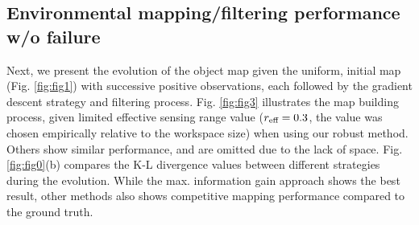 \documentclass[letterpaper, 10 pt, conference]{ieeeconf}
\begin{document}
\subsection{Environmental mapping/filtering performance w/o failure}
Next, we present the evolution of the object map given the uniform, initial map (Fig. \ref{fig:fig1}) with successive positive observations, each followed by the gradient descent strategy and filtering process. Fig. \ref{fig:fig3} illustrates the map building process, given limited effective sensing range value ($r_{\textup{eff}}=0.3$, the value was chosen empirically relative to the workspace size) when using our robust method. Others show similar performance, and are omitted due to the lack of space.
%
%
Fig. \ref{fig:fig0}(b) compares the K-L divergence values between different strategies during the evolution. While the max. information gain approach shows the best result, other methods also shows competitive mapping performance compared to the ground truth.
\end{document}
